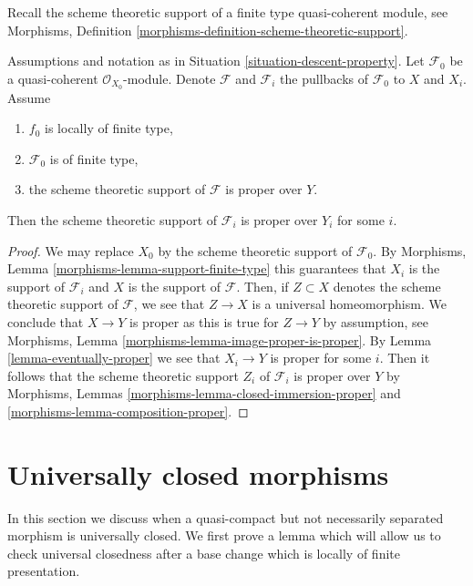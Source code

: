 \noindent
Recall the scheme theoretic support of
a finite type quasi-coherent module, see
Morphisms, Definition \ref{morphisms-definition-scheme-theoretic-support}.

\begin{lemma}
\label{lemma-eventually-proper-support}
Assumptions and notation as in Situation \ref{situation-descent-property}.
Let $\mathcal{F}_0$ be a quasi-coherent $\mathcal{O}_{X_0}$-module.
Denote $\mathcal{F}$ and $\mathcal{F}_i$ the pullbacks of
$\mathcal{F}_0$ to $X$ and $X_i$. Assume
\begin{enumerate}
\item $f_0$ is locally of finite type,
\item $\mathcal{F}_0$ is of finite type,
\item the scheme theoretic support of $\mathcal{F}$ is proper over $Y$.
\end{enumerate}
Then the scheme theoretic support of $\mathcal{F}_i$ is proper over $Y_i$
for some $i$.
\end{lemma}

\begin{proof}
We may replace $X_0$ by the scheme theoretic support of $\mathcal{F}_0$.
By Morphisms, Lemma \ref{morphisms-lemma-support-finite-type} this
guarantees that $X_i$ is the support of $\mathcal{F}_i$ and $X$ is the
support of $\mathcal{F}$. Then, if $Z \subset X$ denotes the scheme
theoretic support of $\mathcal{F}$, we see that $Z \to X$ is a universal
homeomorphism. We conclude that $X \to Y$ is proper as this is true for
$Z \to Y$ by assumption, see
Morphisms, Lemma \ref{morphisms-lemma-image-proper-is-proper}.
By Lemma \ref{lemma-eventually-proper} we see that $X_i \to Y$ is proper
for some $i$. Then it follows that the scheme theoretic support $Z_i$ of
$\mathcal{F}_i$ is proper over $Y$ by
Morphisms, Lemmas \ref{morphisms-lemma-closed-immersion-proper} and
\ref{morphisms-lemma-composition-proper}.
\end{proof}











\section{Universally closed morphisms}
\label{section-universally-closed}

\noindent
In this section we discuss when a quasi-compact but not necessarily
separated morphism is universally closed. We first prove a lemma which
will allow us to check universal closedness after a base change
which is locally of finite presentation.


